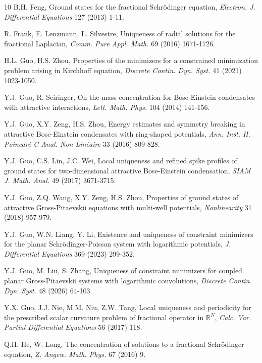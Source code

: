 \documentclass[reqno, 11pt]{amsart} %
\numberwithin{equation}{section}
\begin{document}
\begin{thebibliography}{10}
		B.H. Feng,
		Ground states for the fractional Schr\"{o}dinger equation,
		{\em Electron. J. Differential Equations} 127 (2013) 1-11.
		
		R. Frank, E. Lenzmann, L. Silvestre,
		Uniqueness of radial solutions for the fractional Laplacian,  {\em Comm. Pure Appl. Math.} 69 (2016) 1671-1726.
		
		H.L. Guo, H.S. Zhou,
		Properties of the minimizers for a constrained minimization problem arising in Kirchhoff equation, {\em Discrete Contin. Dyn. Syst.} 41 (2021) 1023-1050.
		
		
		Y.J. Guo, R. Seiringer,
		On the mass concentration for Bose-Einstein condensates with attractive interactions, {\em Lett. Math. Phys.} 104 (2014) 141-156.
		
		Y.J. Guo, X.Y. Zeng, H.S. Zhou,
		Energy estimates and symmetry breaking in attractive Bose-Einstein condensates with ring-shaped potentials,
		{\em Ann. Inst. H. Poincar\'{e} C Anal. Non Lin\'{e}aire} 33 (2016) 809-828.
		
		Y.J. Guo, C.S. Lin, J.C. Wei,
		Local uniqueness and refined spike profiles of ground states for two-dimensional attractive Bose-Einstein condensation, {\em SIAM J. Math. Anal.} 49 (2017) 3671-3715.
		
		Y.J. Guo, Z.Q. Wang, X.Y. Zeng, H.S. Zhou,
		Properties of ground states of attractive Gross-Pitaevskii equations with multi-well potentials, {\em Nonlinearity} 31 (2018) 957-979.
		
		Y.J. Guo, W.N. Liang, Y. Li,
		Existence and uniqueness of constraint minimizers for the planar Schr\"{o}dinger-Poisson system with logarithmic potentials, {\em J. Differential Equations} 369 (2023) 299-352.
		
		Y.J. Guo, M. Liu, S. Zhang,
		Uniqueness of constraint minimizers for coupled planar Gross-Pitaevskii systems with logarithmic convolutions,
		{\em Discrete Contin. Dyn. Syst.} 48 (2026) 64-103.
		
		
		
		Y.X. Guo, J.J. Nie, M.M. Niu, Z.W. Tang,
		Local uniqueness and periodicity for the prescribed scalar curvature problem of fractional operator in $\mathbb{R}^{N}$,
		{\em Calc. Var. Partial Differential Equations} 56 (2017) 118.
		
		Q.H. He, W. Long,
		The concentration of solutions to a fractional Schr\"{o}dinger equation, {\em Z. Angew. Math. Phys.} 67 (2016) 9.
		

\end{thebibliography}
\end{document}
